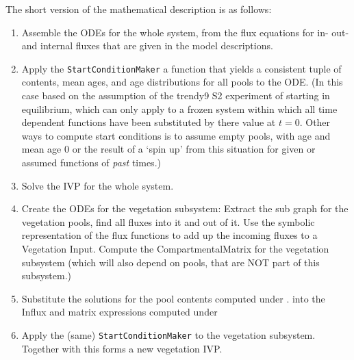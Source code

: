 The short version of the mathematical description is as follows:
\begin{enumerate} 
  \item 
    Assemble the ODEs for the whole system, from the flux
    equations for in- out- and internal fluxes that are given in the model
    descriptions.  
  \item 
    Apply the \texttt{StartConditionMaker} a function that
    yields a consistent tuple of contents, mean ages, and age distributions
    for all pools to the ODE.  (In this case based on the assumption of the
    trendy9 S2 experiment of starting in equilibrium, which can only apply to
    a frozen system within which all time dependent functions have been
    substituted by there value at $t=0$.  Other ways to compute
    start conditions is to assume empty pools, with age and mean age $0$ or the
    result of a `spin up' from this situation for given or assumed functions of
    \emph{past} times.) 
  \item 
    Solve the IVP for the whole system.
    \label{enum:solveIVP} 
  \item 
    \label{enum:symVeg} Create the ODEs for the
    vegetation subsystem: Extract the sub graph for the vegetation pools, find
    all fluxes into it and out of it.  Use the symbolic representation of the
    flux functions to add up the incoming fluxes to a Vegetation Input.
    Compute the CompartmentalMatrix for the vegetation subsystem (which will
    also depend on pools, that are NOT part of this subsystem.) 
  \item
        \label{enum:numVeg} Substitute the solutions for the pool contents
        computed under .  into the Influx and matrix
        expressions computed under 

  \item 
      Apply the (same) \texttt{StartConditionMaker} to the vegetation
      subsystem.  Together with  this forms a new
      vegetation IVP.
      

\end{enumerate}
